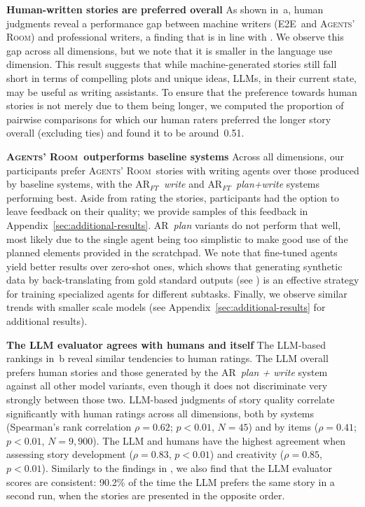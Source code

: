 \documentclass{article}
\newcommand{\Agentsroom}{\textsc{Agents' Room}}
\newcommand{\agentsroomft}{{\sc AR$_{FT}$}}
\newcommand{\baseline}{{\sc E2E}}
\begin{document}
\textbf{Human-written stories are preferred overall} As shown in~a, human judgments reveal a
performance gap between machine writers (\baseline\ and \Agentsroom)
and professional writers, a finding that is in line with
\cite{chakrabarty:ea:2024a}. We observe this gap across all
dimensions, but we note that it is smaller in the language use
dimension. This
result suggests that while machine-generated stories still fall short
in terms of compelling plots and unique ideas, LLMs, in their current
state, may be useful as writing assistants. To ensure that the preference towards human stories is not
merely due to them being longer, we computed the proportion of
pairwise comparisons for which our human raters preferred the longer
story overall (excluding ties) and found it to be around~0.51. 

\textbf{\Agentsroom\ outperforms baseline systems} Across all
dimensions, our participants prefer \Agentsroom\ stories with writing
agents over those produced by baseline systems, with the
\agentsroomft~{\it write} and \agentsroomft~{\it plan+write} systems
performing best. Aside from rating the stories, participants had the option to leave feedback on their quality; we provide samples of this feedback  in Appendix~\ref{sec:additional-results}. {\sc AR}~{\it plan} variants do not perform that
well, most likely due to the single {\sc [finalizer]} agent being too
simplistic to make good use of the planned elements provided in the
scratchpad. We note that fine-tuned agents yield better results over
zero-shot ones, which shows that generating synthetic data by
back-translating from gold standard outputs (see
) is an effective strategy for training
specialized agents for different subtasks. Finally, we observe similar
trends with smaller scale models (see
Appendix~\ref{sec:additional-results} for additional results).



\textbf{The LLM evaluator agrees with humans and itself} The LLM-based rankings in~b reveal similar tendencies to human ratings. The LLM overall prefers human stories and those generated by the {\sc AR}~{\it plan + write} system against all other model variants, even though it does not discriminate very strongly between those two. LLM-based judgments of story quality  correlate significantly
with human ratings across all dimensions, both  by systems (Spearman's rank correlation $\rho=0.62$; \mbox{$p<0.01$}, $N=45$) and  by items ($\rho=0.41$; \mbox{$p<0.01$}, $N=9,900$). The  LLM and humans have the highest agreement when assessing story development ($\rho=0.83$, \mbox{$p<0.01$}) and creativity ($\rho=0.85$, \mbox{$p<0.01$}). Similarly to the findings in \cite{bohnet2024long}, we also find that the LLM evaluator scores are consistent: 90.2\% of the time the LLM prefers the same story in a second run, when the stories are presented in the opposite order. 
\end{document}
